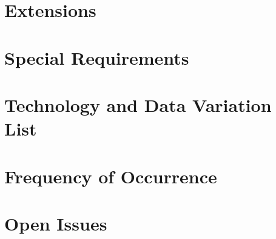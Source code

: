 \documentclass[11pt,a4paper]{article}
\begin{document}
\subsection{}
\subsection{}
\section{Extensions}
\subsection{}
\subsection{}
\section{Special Requirements}
\section{Technology and Data Variation List}
\section{Frequency of Occurrence}
\section{Open Issues}
\end{document}
